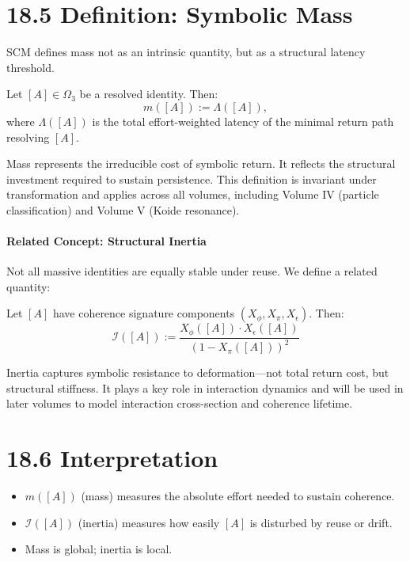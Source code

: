\section{18.5 \textbar{} Definition: Symbolic Mass}
SCM defines mass not as an intrinsic quantity, but as a structural latency threshold.

\begin{definition}
Let $[A] \in \Omega_3$ be a resolved identity. Then:
\[
m([A]) := \Lambda([A]),
\]
where $\Lambda([A])$ is the total effort-weighted latency of the minimal return path resolving $[A]$.
\end{definition}

\noindent Mass represents the irreducible cost of symbolic return. It reflects the structural investment required to sustain persistence. This definition is invariant under transformation and applies across all volumes, including Volume IV (particle classification) and Volume V (Koide resonance).

\paragraph{Related Concept: Structural Inertia}

Not all massive identities are equally stable under reuse. We define a related quantity:

\begin{definition}
Let $[A]$ have coherence signature components $(X_\phi, X_\pi, X_\epsilon)$. Then:
\[
\mathcal{I}([A]) := \frac{X_\phi([A]) \cdot X_\epsilon([A])}{(1 - X_\pi([A]))^2}
\]
\end{definition}

\noindent Inertia captures symbolic resistance to deformation—not total return cost, but structural stiffness. It plays a key role in interaction dynamics and will be used in later volumes to model interaction cross-section and coherence lifetime.

\section{18.6 \textbar{} Interpretation}
\begin{itemize}
    \item $m([A])$ (mass) measures the absolute effort needed to sustain coherence.
    \item $\mathcal{I}([A])$ (inertia) measures how easily $[A]$ is disturbed by reuse or drift.
    \item Mass is global; inertia is local.
\end{itemize}

